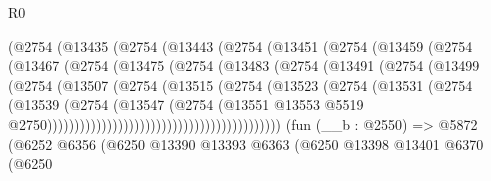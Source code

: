 \begin{lexlean}{R0}
\begin{coremodule}
                          (@2754
                            (@13435
                              (@2754
                                (@13443
                                  (@2754
                                    (@13451
                                      (@2754
                                        (@13459
                                          (@2754
                                            (@13467
                                              (@2754
                                                (@13475
                                                  (@2754
                                                    (@13483
                                                      (@2754
                                                        (@13491
                                                          (@2754
                                                            (@13499
                                                              (@2754
                                                                (@13507
                                                                  (@2754
                                                                    (@13515
                                                                      (@2754
                                                                        (@13523
                                                                          (@2754
                                                                            (@13531
                                                                              (@2754
                                                                                (@13539
                                                                                  (@2754
                                                                                    (@13547
                                                                                      (@2754
                                                                                        (@13551
                                                                                          @13553
                                                                                          @5519
                                                                                          @2750)))))))))))))))))))))))))))))))))))))))))))
    (fun (__b : @2550) =>
    @5872
      (@6252
        @6356
        (@6250
          @13390
          @13393
          @6363
          (@6250
            @13398
            @13401
            @6370
            (@6250

\end{coremodule}
\end{lexlean}
